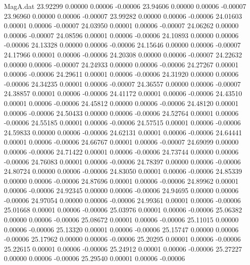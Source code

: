 \begin{filecontents}{MagA.dat}
  23.92299    0.00000    0.00006   -0.00006
  23.94606    0.00000    0.00006   -0.00007
  23.96960    0.00000    0.00006   -0.00007
  23.99282    0.00000    0.00006   -0.00006
  24.01603    0.00001    0.00006   -0.00007
  24.03950    0.00001    0.00006   -0.00007
  24.06262    0.00000    0.00006   -0.00007
  24.08596    0.00001    0.00006   -0.00006
  24.10893    0.00000    0.00006   -0.00006
  24.13328    0.00000    0.00006   -0.00006
  24.15646    0.00000    0.00006   -0.00007
  24.17966    0.00001    0.00006   -0.00006
  24.20308    0.00000    0.00006   -0.00007
  24.22632    0.00000    0.00006   -0.00007
  24.24933    0.00000    0.00006   -0.00006
  24.27267    0.00001    0.00006   -0.00006
  24.29611    0.00001    0.00006   -0.00006
  24.31920    0.00000    0.00006   -0.00006
  24.34235    0.00001    0.00006   -0.00007
  24.36557    0.00000    0.00006   -0.00007
  24.38857    0.00001    0.00006   -0.00006
  24.41172    0.00001    0.00006   -0.00006
  24.43510    0.00001    0.00006   -0.00006
  24.45812    0.00000    0.00006   -0.00006
  24.48120    0.00001    0.00006   -0.00006
  24.50433    0.00000    0.00006   -0.00006
  24.52764    0.00001    0.00006   -0.00006
  24.55185    0.00001    0.00006   -0.00006
  24.57515    0.00001    0.00006   -0.00006
  24.59833    0.00000    0.00006   -0.00006
  24.62131    0.00001    0.00006   -0.00006
  24.64441    0.00001    0.00006   -0.00006
  24.66767    0.00001    0.00006   -0.00007
  24.69099    0.00000    0.00006   -0.00006
  24.71422    0.00001    0.00006   -0.00006
  24.73744    0.00000    0.00006   -0.00006
  24.76083    0.00001    0.00006   -0.00006
  24.78397    0.00000    0.00006   -0.00006
  24.80724    0.00000    0.00006   -0.00006
  24.83050    0.00001    0.00006   -0.00006
  24.85339    0.00000    0.00006   -0.00006
  24.87696    0.00001    0.00006   -0.00006
  24.89962    0.00001    0.00006   -0.00006
  24.92345    0.00000    0.00006   -0.00006
  24.94695    0.00000    0.00006   -0.00006
  24.97054    0.00000    0.00006   -0.00006
  24.99361    0.00001    0.00006   -0.00006
  25.01668    0.00001    0.00006   -0.00006
  25.03976    0.00001    0.00006   -0.00006
  25.06382    0.00000    0.00006   -0.00006
  25.08672    0.00001    0.00006   -0.00006
  25.11015    0.00000    0.00006   -0.00006
  25.13320    0.00001    0.00006   -0.00006
  25.15747    0.00000    0.00006   -0.00006
  25.17962    0.00000    0.00006   -0.00006
  25.20295    0.00001    0.00006   -0.00006
  25.22615    0.00001    0.00006   -0.00006
  25.24912    0.00001    0.00006   -0.00006
  25.27227    0.00000    0.00006   -0.00006
  25.29540    0.00001    0.00006   -0.00006

\end{filecontents}
